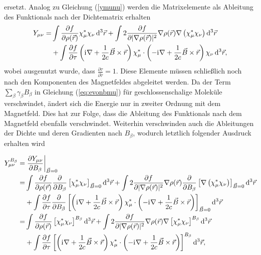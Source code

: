 ersetzt. Analog zu Gleichung (\ref{ymunu}) werden die Matrixelemente als Ableitung des Funktionals nach der Dichtematrix erhalten
\begin{equation}
\begin{aligned}
Y_{\mu\nu}=&\int\frac{\partial f}{\partial \rho(\vec{r})}\chi_\mu^*\chi_\nu\mathop{}\!\mathrm{d^3}\vec{r}
+\int 2\frac{\partial f}{\partial \vert\nabla \rho(\vec{r})\vert^2}\nabla \rho(\vec{r})\nabla \left(\chi_\mu^*\chi_\nu\right)\mathop{}\!\mathrm{d^3}\vec{r}\\
&+\int\frac{\partial f}{\partial\tau}\left(\mathrm{i}\mkern1mu\nabla +\frac{1}{2c}\vec{B}\times\vec{r}\right)\chi_\mu^*\cdot\left(-\mathrm{i}\mkern1mu\nabla+\frac{1}{2c}\vec{B}\times\vec{r}\right)\chi_\nu\mathop{}\!\mathrm{d^3}\vec{r},
\end{aligned}
\end{equation}
wobei ausgenutzt wurde, dass $\frac{\partial \tau}{\partial \tilde{\tau}}=1$. Diese Elemente müssen schließlich noch nach den Komponenten des Magnetfeldes abgeleitet werden. Da der Term $\sum_\beta \gamma_\beta B_\beta$ in Gleichung (\ref{eq:evonbmu}) für geschlossenschalige Moleküle verschwindet, ändert sich die Energie nur in zweiter Ordnung mit dem Magnetfeld. Dies hat zur Folge, dass die Ableitung des Funktionals nach dem Magnetfeld ebenfalls verschwindet. Weiterhin verschwinden auch die Ableitungen der Dichte und deren Gradienten nach $B_\beta$,\supercite{lee1995density} wodurch letztlich folgender Ausdruck erhalten wird\supercite{maximoff2004nuclear} 

\begin{equation}
\begin{aligned}
Y_{\mu\nu}^{B_\beta}=&\left.\frac{\partial Y_{\mu\nu}}{\partial B_\beta}\right\vert_{\vec{B}=0}\\
=&\int\frac{\partial f}{\partial \rho(\vec{r})}\frac{\partial}{\partial B_\beta}\left[\chi_\mu^*\chi_\nu\right]_{\vec{B}=0}\mathop{}\!\mathrm{d^3}\vec{r}
+\int 2\frac{\partial f}{\partial \vert\nabla \rho(\vec{r})\vert^2}\nabla \rho(\vec{r})\frac{\partial}{\partial B_\beta}\left[\nabla \left(\chi_\mu^*\chi_\nu\right)\right]_{\vec{B}=0}\mathop{}\!\mathrm{d^3}\vec{r}\\
&+\int\frac{\partial f}{\partial\tau}\frac{\partial}{\partial B_\beta}\left[\left(\mathrm{i}\mkern1mu\nabla +\frac{1}{2c}\vec{B}\times\vec{r}\right)\chi_\mu^*\cdot\left(-\mathrm{i}\mkern1mu\nabla+\frac{1}{2c}\vec{B}\times\vec{r}\right)\right]_{\vec{B}=0}\mathop{}\!\mathrm{d^3}\vec{r}\\
=&\int\frac{\partial f}{\partial \rho(\vec{r})}\left[\chi_\mu^*\chi_\nu\right]^{B_\beta}\mathop{}\!\mathrm{d^3}\vec{r}
+\int 2\frac{\partial f}{\partial \vert\nabla \rho(\vec{r})\vert^2}\nabla \rho(\vec{r})\nabla \left[\chi_\mu^*\chi_\nu\right]^{B_\beta}\mathop{}\!\mathrm{d^3}\vec{r}\\
&+\int\frac{\partial f}{\partial\tau}\left[\left(\mathrm{i}\mkern1mu\nabla +\frac{1}{2c}\vec{B}\times\vec{r}\right)\chi_\mu^*\cdot\left(-\mathrm{i}\mkern1mu\nabla+\frac{1}{2c}\vec{B}\times\vec{r}\right)\right]
^{B_\beta}\mathop{}\!\mathrm{d^3}\vec{r},
\end{aligned}
\end{equation}

